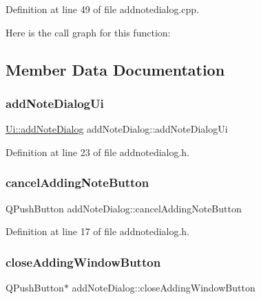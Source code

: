 Definition at line 49 of file addnotedialog.\+cpp.

Here is the call graph for this function\+:


\subsection{Member Data Documentation}
\hypertarget{classaddNoteDialog_a4fd2dea6a480150e92f58bc0d415a83e}{}\label{classaddNoteDialog_a4fd2dea6a480150e92f58bc0d415a83e} 
\subsubsection{\texorpdfstring{add\+Note\+Dialog\+Ui}{addNoteDialogUi}}
{\footnotesize\ttfamily \hyperlink{classUi_1_1addNoteDialog}{Ui\+::add\+Note\+Dialog} add\+Note\+Dialog\+::add\+Note\+Dialog\+Ui\hspace{0.3cm}{\ttfamily [private]}}



Definition at line 23 of file addnotedialog.\+h.

\hypertarget{classaddNoteDialog_a05ecc54eb7cba0d6ffbc5cabc8a4f551}{}\label{classaddNoteDialog_a05ecc54eb7cba0d6ffbc5cabc8a4f551} 
\subsubsection{\texorpdfstring{cancel\+Adding\+Note\+Button}{cancelAddingNoteButton}}
{\footnotesize\ttfamily Q\+Push\+Button add\+Note\+Dialog\+::cancel\+Adding\+Note\+Button}



Definition at line 17 of file addnotedialog.\+h.

\hypertarget{classaddNoteDialog_af1d9adf48985dc8ca2ec30c60c3d569e}{}\label{classaddNoteDialog_af1d9adf48985dc8ca2ec30c60c3d569e} 
\subsubsection{\texorpdfstring{close\+Adding\+Window\+Button}{closeAddingWindowButton}}
{\footnotesize\ttfamily Q\+Push\+Button$\ast$ add\+Note\+Dialog\+::close\+Adding\+Window\+Button}



